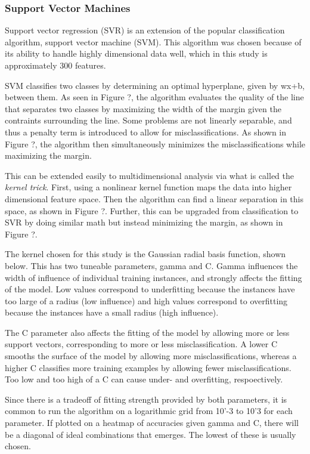 \subsubsection{Support Vector Machines}
\label{sec:svm}

Support vector regression (SVR) is an extension of the popular classification
algorithm, support vector machine (SVM).  This algorithm was chosen because of
its ability to handle highly dimensional data well, which in this study is
approximately 300 features. 

SVM classifies two classes by determining an optimal hyperplane, given by wx+b,
between them.  As seen in Figure ?, the algorithm evaluates the quality of the
line that separates two classes by maximizing the width of the margin given the
contraints surrounding the line.  Some problems are not linearly separable, and
thus a penalty term is introduced to allow for misclassifications. As shown in
Figure ?, the algorithm then simultaneously minimizes the misclassifications
while maximizing the margin. 

This can be extended easily to multidimensional analysis via what is called the
\textit{kernel trick}.  First, using a nonlinear kernel function maps the data
into higher dimensional feature space. Then the algorithm can find a linear
separation in this space, as shown in Figure ?. Further, this can be upgraded
from classification to SVR by doing similar math but instead minimizing the
margin, as shown in Figure ?. 

The kernel chosen for this study is the Gaussian radial basis function, shown
below. This has two tuneable parameters, gamma and C. Gamma influences the
width of influence of individual training instances, and strongly affects the
fitting of the model. Low values correspond to underfitting because the
instances have too large of a radius (low influence) and high values correspond
to overfitting because the instances have a small radius (high influence). 

The C parameter also affects the fitting of the model by allowing more or less
support vectors, corresponding to more or less misclassification. A lower C
smooths the surface of the model by allowing more misclassifications, whereas a
higher C classifies more training examples by allowing fewer
misclassifications. Too low and too high of a C can cause under- and
overfitting, respoectively. 

Since there is a tradeoff of fitting strength provided by both parameters, it
is common to run the algorithm on a logarithmic grid from 10'-3 to 10'3 for
each parameter. If plotted on a heatmap of accuracies given gamma and C, there
will be a diagonal of ideal combinations that emerges. The lowest of these is
usually chosen. 


